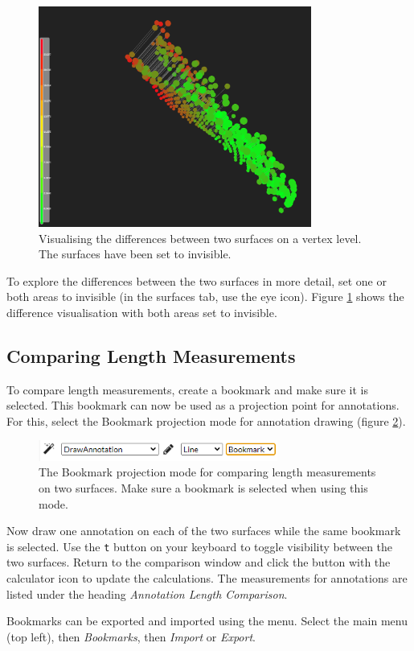 \begin{figure}[h]
	\centering
	\includegraphics[width=0.8\textwidth]{pics/surfaceComparisonArea3DView2.PNG}
	\caption[Visualising the differences between two surfaces.]{Visualising the differences between two surfaces on a vertex level. The surfaces have been set to invisible.}
	\label{surfaceComparisonArea3DView2.PNG}
\end{figure}

To explore the differences between the two surfaces in more detail, set one or both areas to invisible (in the surfaces tab, use the eye icon). Figure \ref{surfaceComparisonArea3DView2.PNG} shows the difference visualisation with both areas set to invisible.

\clearpage
\subsection{Comparing Length Measurements}

To compare length measurements, create a bookmark and make sure it is selected. This bookmark can now be used as a projection point for annotations. For this, select the Bookmark projection mode for annotation drawing (figure \ref{fig:surfaceComparisonBookmarkMode}).

\begin{figure}[h]
	\centering
	\includegraphics[width=0.7\textwidth]{pics/surfaceComparisonBookmarkMode.PNG}
	\caption[The Bookmark Projection Mode.]{The Bookmark projection mode for comparing length measurements on two surfaces. Make sure a bookmark is selected when using this mode.}
	\label{fig:surfaceComparisonBookmarkMode}
\end{figure}

Now draw one annotation on each of the two surfaces while the same bookmark is selected. Use the \texttt{t} button on your keyboard to toggle visibility between the two surfaces. Return to the comparison window and click the button with the calculator icon to update the calculations. The measurements for annotations are listed under the heading \emph{Annotation Length Comparison}.

Bookmarks can be exported and imported using the menu. Select the main menu (top left), then \emph{Bookmarks}, then \emph{Import} or \emph{Export}.